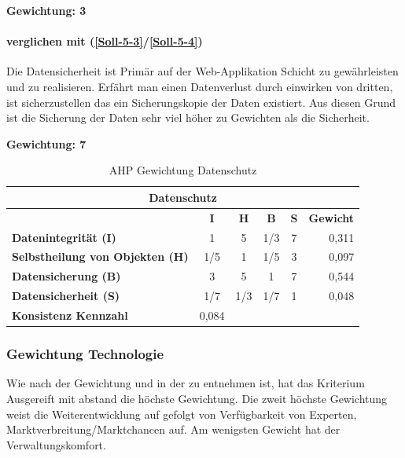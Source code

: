 \textbf{Gewichtung: 3}

\paragraph*{ verglichen mit  (\ref{Soll-5-3}/\ref{Soll-5-4})}
Die Datensicherheit ist Primär auf der Web-Applikation Schicht zu gewährleisten und zu realisieren. Erfährt man einen Datenverlust durch einwirken von dritten, ist sicherzustellen das ein Sicherungskopie der Daten existiert. Aus diesen Grund ist die Sicherung der Daten sehr viel höher zu Gewichten als die Sicherheit. 

\textbf{Gewichtung: 7}

\begin{table}[htbp]
\caption{AHP Gewichtung Datenschutz}
\begin{tabular}{|l|c|c|c|c|l|}
\hline
\multicolumn{6}{|c|}{\textbf{Datenschutz}} \\ \hline
 & \multicolumn{1}{c|}{\textbf{I}} & \multicolumn{1}{c|}{\textbf{H}} & \multicolumn{1}{c|}{\textbf{B}} & \multicolumn{1}{c|}{\textbf{S}} & \multicolumn{1}{l|}{\textbf{Gewicht}} \\ \hline
\textbf{Datenintegrität (I)} & 1 & 5 & 1/3 & 7 & \multicolumn{1}{r|}{0,311} \\ \hline
\textbf{Selbstheilung von Objekten (H)} & 1/5 & 1 & 1/5 & 3 & \multicolumn{1}{r|}{0,097} \\ \hline
\textbf{Datensicherung (B)} & 3 & 5 & 1 & 7 & \multicolumn{1}{r|}{0,544} \\ \hline
\textbf{Datensicherheit (S)} & 1/7 & 1/3 & 1/7 & 1 & \multicolumn{1}{r|}{0,048} \\ \hline
\textbf{Konsistenz Kennzahl} & 0,084 \\ \cline{1-2}
\end{tabular}
\label{tab:AHPDatenschutz}
\end{table}

\subsubsection{Gewichtung Technologie}

Wie nach der Gewichtung und in der  zu entnehmen ist, hat das Kriterium Ausgereift mit abstand die höchste Gewichtung. Die zweit höchste Gewichtung weist die Weiterentwicklung auf gefolgt von Verfügbarkeit von Experten, Marktverbreitung/Marktchancen auf. Am wenigsten Gewicht hat der Verwaltungskomfort.


